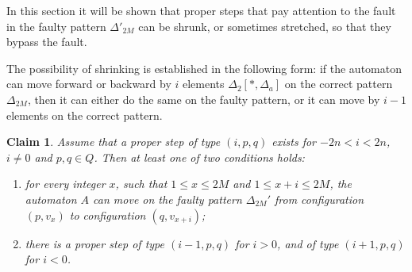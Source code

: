 \documentclass[12pt,a4paper]{article}
\newtheorem{claim}{Claim}
\theoremstyle{definition}
\begin{document}
In this section it will be shown that proper steps
that pay attention to the fault in the faulty pattern $\Delta'_{2M}$
can be shrunk, or sometimes stretched,
so that they bypass the fault.

The possibility of shrinking is established in the following form:
if the automaton can move forward or backward by $i$ elements $\Delta_2[*,\Delta_a]$
on the correct pattern $\Delta_{2M}$,
then it can either do the same on the faulty pattern,
or it can move by $i-1$ elements on the correct pattern.

\begin{claim}\label{claim_shrunk_moves}
Assume that a proper step of type $(i,p,q)$ exists
for $-2n < i < 2n$, $i \neq 0$ and $p,q \in Q$.
Then at least one of two conditions holds:
\begin{enumerate}\renewcommand{\theenumi}{\Roman{enumi}}
\item	\label{claim_shrunk_moves__step_i_on_Delta_prime}
	for every integer $x$,
	such that $1 \leqslant x \leqslant 2M$ and $1 \leqslant x+i \leqslant 2M$, 
	the automaton $A$ can move on the faulty pattern $\Delta_{2M}'$ 
	from configuration $(p,v_x)$ to configuration $(q,v_{x+i})$;
\item	\label{claim_shrunk_moves__step_i_minus_1}
	there is a proper step of type $(i-1,p,q)$ for $i>0$,
	and of type $(i+1,p,q)$ for $i<0$.
\end{enumerate}
\end{claim}
\end{document}
